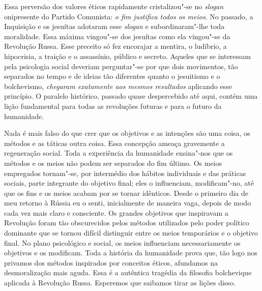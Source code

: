 Essa perversão dos valores éticos rapidamente cristalizou"-se no \textit{slogan}
onipresente do Partido Comunista: \textit{o fim justifica todos os meios}. No
passado, a Inquisição e os jesuítas adotaram esse \textit{slogan} e
subordinaram"-lhe toda moralidade. Essa máxima vingou"-se dos
jesuítas como ela vingou"-se da Revolução Russa. Esse preceito só fez
encorajar a mentira, o ludíbrio, a hipocrisia, a traição e o
assassínio, público e secreto. Aqueles que se interessam pela
psicologia social deveriam perguntar"-se por que dois movimentos, tão
separados no tempo e de ideias tão diferentes quanto o jesuitismo e o
bolchevismo, \textit{chegaram exatamente aos mesmos resultados} aplicando esse 
princípio. O paralelo histórico, passado quase despercebido até aqui,
contém uma lição fundamental para todas as revoluções futuras e para o
futuro da humanidade.

Nada é mais falso do que crer que os objetivos e as intenções são uma
coisa, os métodos e as táticas outra coisa. Essa concepção ameaça
gravemente a regeneração social. Toda a experiência da humanidade
ensina"-nos que os métodos e os meios não podem ser separados do fim
último. Os meios empregados tornam"-se, por intermédio dos hábitos
individuais e das práticas sociais, parte integrante do objetivo final;
eles o influenciam, modificam"-no, até que os fins e os meios acabam
por se tornar idênticos. Desde o primeiro dia de meu retorno à Rússia
eu o senti, inicialmente de maneira vaga, depois de modo cada vez mais claro e
consciente. Os grandes objetivos que inspiravam a Revolução foram
tão obscurecidos pelos métodos utilizados pelo poder político dominante
que se tornou difícil distinguir entre os meios temporários e o
objetivo final. No plano psicológico e social, os meios influenciam
necessariamente os objetivos e os modificam. Toda a história da
humanidade prova que, tão logo nos privamos dos métodos inspirados por
conceitos éticos, afundamos na desmoralização mais aguda. Essa é a
autêntica tragédia da filosofia bolchevique aplicada à Revolução Russa.
Esperemos que saibamos tirar as lições disso.

